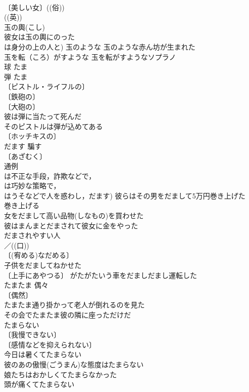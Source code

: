 \documentclass[8pt]{extreport}
\begin{document}
\begin{CJK}{UTF8}{min}
\\	〔美しい女〕((俗)) 
\\	((英)) 
\\	玉の輿(こし) 
\\	彼女は玉の輿にのった 
\\	は身分の上の人と) 玉のような 玉のような赤ん坊が生まれた 
\\	玉を転（ころ）がすような 玉を転がすようなソプラノ 
\\	球	たま	
\\	弾	たま	
\\	〔ピストル・ライフルの〕
\\	〔鉄砲の〕
\\	〔大砲の〕
\\	彼は弾に当たって死んだ 
\\	そのピストルは弾が込めてある 
\\	〔ホッチキスの〕
\\	だます	騙す	
\\	〔あざむく〕
\\	通例 
\\	は不正な手段，詐欺などで，
\\	は巧妙な策略で，
\\	はうそなどで人を惑わし，だます) 彼らはその男をだまして5万円巻き上げた 
\\	巻き上げる　
\\	女をだまして高い品物(しなもの)を買わせた 
\\	彼はまんまとだまされて彼女に金をやった 
\\	だまされやすい人 
\\	／((口)) 
\\	〔(宥める)なだめる〕
\\	子供をだましてねかせた 
\\	〔上手にあやつる〕 がたがたいう車をだましだまし運転した 
\\	たまたま	偶々	
\\	〔偶然〕
\\	たまたま通り掛かって老人が倒れるのを見た 
\\	その会でたまたま彼の隣に座っただけだ 
\\	たまらない		
\\	〔我慢できない〕
\\	〔感情などを抑えられない〕
\\	今日は暑くてたまらない 
\\	彼のあの傲慢(ごうまん)な態度はたまらない 
\\	娘たちはおかしくてたまらなかった 
\\	頭が痛くてたまらない 

\end{CJK}
\end{document}
